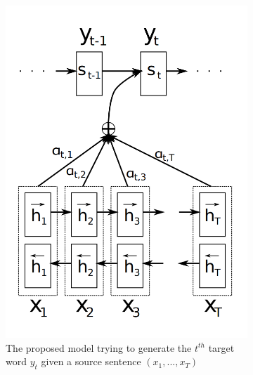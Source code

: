 \documentclass{article}
\begin{document}
	\begin{figure}
		\centering
		\begin{subfigure}{0.35\textwidth}
			\label{fig:bahatn1}
			\centering
			\includegraphics[width=1\textwidth]{fig/adatn1.png}
			\caption{The proposed model trying to generate the \(t^{th}\) target word \(y_t\) given a source sentence \((x_1,..., x_T)\)}
		\end{subfigure}
		\hspace*{2em} %
		\begin{subfigure}{0.45\textwidth}
			\label{fig:bahatn2}
			\centering

\end{subfigure}
\end{figure}
\end{document}

